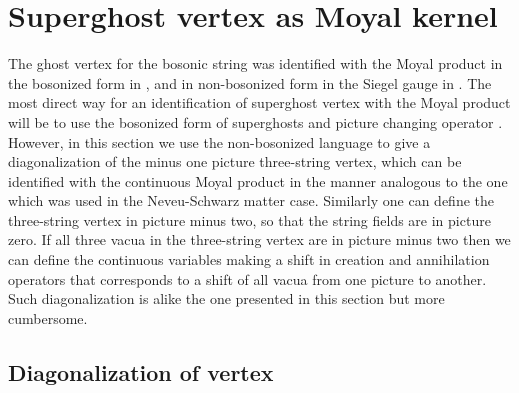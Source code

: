 \documentclass[a4paper,12pt]{article}
\begin{document}
\section{Superghost vertex as Moyal kernel}
\label{sec:ghost-ver}
\setcounter{equation}{0}

The ghost vertex for the bosonic string was identified with
the Moyal product in the bosonized form in \cite{0204260}, \cite{0207174}
and in non-bosonized form in the Siegel gauge in \cite{0205107}.
The most direct way for an identification of superghost vertex with
the Moyal product will be to use the bosonized form of superghosts
and picture changing operator \coordHE{}.
However, in this section we use the non-bosonized language
to give a diagonalization of the minus one picture three-string
vertex,
which can be identified
with the continuous Moyal product in the manner analogous
to the one which was used in the Neveu-Schwarz matter case.
Similarly one can define the three-string vertex
in picture minus two, so that the string fields are in picture
zero. If all three vacua in the three-string
vertex are in picture minus two then we can
define the continuous variables making a shift in creation
and annihilation operators that corresponds to a shift
of all vacua from one picture to another.
Such diagonalization is alike the one
presented in this section but more cumbersome.

\subsection{Diagonalization of vertex}
\end{document}
